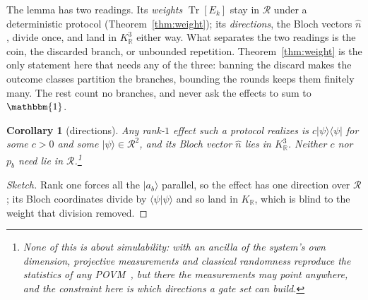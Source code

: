 \documentclass[11pt, oneside, openany]{scrbook}
\DeclareMathOperator{\Tr}{Tr}
\newcommand{\R}{\mathbb{R}}
\newcommand{\Id}{\mathbbm{1}}
\newtheorem{corollary}[theorem]{Corollary}
\newenvironment{sketch}{\renewcommand{\qedsymbol}{}\begin{proof}[Sketch]}{\end{proof}}
\newcommand{\ket}[1]{|#1\rangle}
\newcommand{\braket}[2]{\langle#1|#2\rangle}
\newcommand{\ketbra}[2]{|#1\rangle\langle#2|}
\begin{document}
The lemma has two readings. Its \textit{weights} $\Tr[E_k]$ stay in $\mathcal{R}$ under a deterministic protocol (Theorem~\ref{thm:weight}); its \textit{directions}, the Bloch vectors $\hat n$, divide once, and land in $K_\R^3$ either way. What separates the two readings is the coin, the discarded branch, or unbounded repetition. Theorem~\ref{thm:weight} is the only statement here that needs any of the three: banning the discard makes the outcome classes partition the branches, bounding the rounds keeps them finitely many. The rest count no branches, and never ask the effects to sum to $\Id$.

\begin{corollary}[directions] \label{cor:directions}
Any rank-$1$ effect such a protocol realizes is $c\ketbra{\psi}{\psi}$ for some $c > 0$ and some $\ket{\psi} \in \mathcal{R}^2$, and its Bloch vector $\hat n$ lies in $K_\R^3$. Neither $c$ nor $p_b$ need lie in $\mathcal{R}$.\footnote{None of this is about \textit{simulability}: with an ancilla of the system's own dimension, projective measurements and classical randomness reproduce the statistics of any POVM~\cite[Thm.~1]{oszmaniec2017simulatingpositiveoperatorvaluedmeasures}, but there the measurements may point anywhere, and the constraint here is which directions a gate set can build.}
\end{corollary}

\begin{sketch}
Rank one forces all the $\ket{a_b}$ parallel, so the effect has one direction over $\mathcal{R}$; its Bloch coordinates divide by $\braket{\psi}{\psi}$ and so land in $K_\R$, which is blind to the weight that division removed.
\end{sketch}
\end{document}
